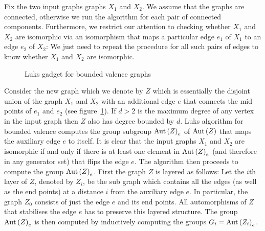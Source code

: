 \documentclass{article}
\begin{document}
Fix the two input graphs graphs $X_1$ and $X_2$. We assume that the
graphs are connected, otherwise we run the algorithm for each pair of
connected components. Furthermore, we restrict our attention to
checking whether $X_1$ and $X_2$ are isomorphic via an isomorphism
that maps a particular edge $e_1$ of $X_1$ to an edge $e_2$ of $X_2$:
We just need to repeat the procedure for all such pairs of edges to
know whether $X_1$ and $X_2$ are isomorphic.
\begin{figure}
  \hfil
  \hfil
  \label{fig-bounded-valence}
  \caption{Luks gadget for bounded valence graphs}
\end{figure}

Consider the new graph which we denote by $Z$ which is essentially the
disjoint union of the graph $X_1$ and $X_2$ with an additional edge
$e$ that connects the mid points of $e_1$ and $e_2$ (see
figure~\ref{fig-bounded-valence}). If $d>2$ is the maximum degree of
any vertex in the input graph then $Z$ also has degree bounded by
$d$. Luks algorithm for bounded valence computes the group subgroup
$\mathrm{Aut}\left(Z\right)_e$ of $\mathrm{Aut}\left(Z\right)$ that maps the auxiliary edge $e$ to
itself. It is clear that the input graphs $X_1$ and $X_2$ are
isomorphic if and only if there is at least one element in $\mathrm{Aut}\left(Z\right)_e$
(and therefore in any generator set) that flips the edge $e$. The
algorithm then proceeds to compute the group $\mathrm{Aut}\left(Z\right)_e$. First the
graph $Z$ is layered as follows: Let the $i$th layer of $Z$, denoted
by $Z_i$, be the sub graph which contains all the edges (as well as
the end points) at a distance $i$ from the auxiliary edge $e$. In
particular, the graph $Z_0$ consists of just the edge $e$ and its end
points. All automorphisms of $Z$ that stabilises the edge $e$ has to
preserve this layered structure. The group $\mathrm{Aut}\left(Z\right)_e$ is then
computed by inductively computing the groups $G_i=\mathrm{Aut}\left(Z_i\right)_e$.
\end{document}
